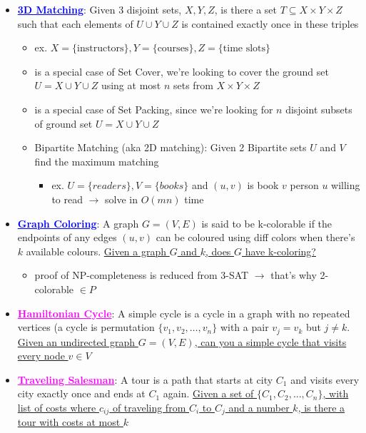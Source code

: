 \begin{itemize}
    \item \textcolor{Blue}{\textbf{\ul{3D Matching}}}: Given 3 disjoint sets, $X, Y, Z$, is there a set $T \subseteq X \times Y \times Z$ such that each elements of $U \cup Y \cup Z$ is contained exactly once in these triples
    \begin{itemize}[leftmargin = 1em]
        \item ex. $X = \{\text{instructors}\}, Y = \{\text{courses}\}, Z = \{\text{time slots}\}$
        \item is a special case of Set Cover, we're looking to cover the ground set $U = X \cup Y \cup Z$ using at most $n$ sets from $X \times Y \times Z$ 
        \item is a special case of Set Packing, since we're looking for $n$ disjoint subsets of ground set $U = X \cup Y \cup Z$
        \item Bipartite Matching (aka 2D matching): Given 2 Bipartite sets $U$ and $V$ find the maximum matching
        \begin{itemize}[leftmargin = 1em]
            \item ex. $U = \{readers\}, V = \{books\}$ and $(u,v)$ is book $v$ person $u$ willing to read $\rightarrow $ solve in $O(mn)$ time
        \end{itemize}
    \end{itemize}
    \item \textcolor{Blue}{\textbf{\ul{Graph Coloring}}}: A graph $G = (V,E)$ is said to be k-colorable if the endpoints of any edges $(u,v)$ can be coloured using diff colors when there's $k$ available colours. \ul{Given a graph $G$ and $k$, does $G$ have k-coloring?} 
    \begin{itemize}
        \item proof of NP-completeness is reduced from 3-SAT $\rightarrow$ that's why 2-colorable $\in P$
    \end{itemize}
    
    \item \textcolor{Magenta}{\textbf{\ul{Hamiltonian Cycle}}}: A simple cycle is a cycle in a graph with no repeated vertices (a cycle is permutation $\{v_1, v_2, \ldots, v_n \}$ with a pair $v_j = v_k$ but $j \neq k$. \ul{Given an undirected graph $G = (V,E)$, can you a simple cycle that visits every node $v \in V$}
    \item \textcolor{Magenta}{\textbf{\ul{Traveling Salesman}}}: A tour is a path that starts at city $C_1$ and visits every city exactly once and ends at $C_1$ again. \ul{Given a set of $ \{C_1, C_2, \ldots, C_n\}$, with list of costs where $c_{ij}$ of traveling from $C_i$ to $C_j$ and a number $k$, is there a tour with costs at most $k$}
    

\end{itemize}
